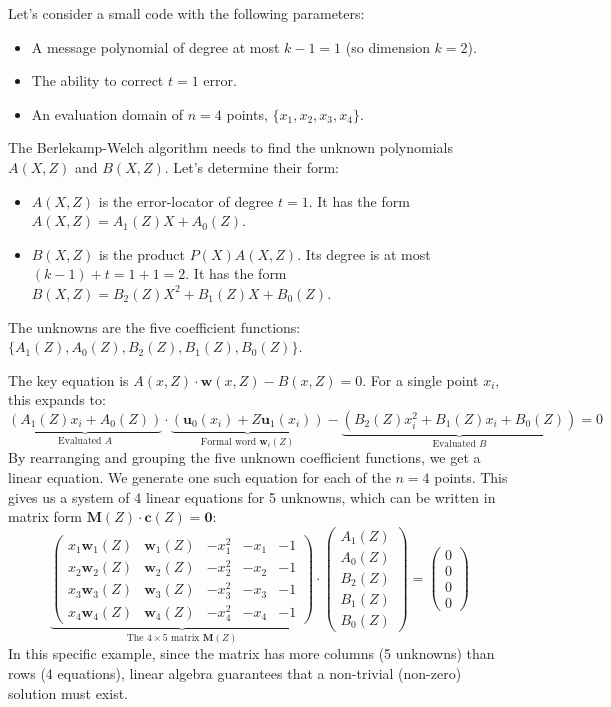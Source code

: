 \documentclass{article}
\begin{document}
\begin{tcolorbox}[breakable, title={Illustration: A Small Example of the Matrix $\mathbf{M}(Z)$}]
Let's consider a small code with the following parameters:
\begin{itemize}
    \item A message polynomial of degree at most $k-1=1$ (so dimension $k=2$).
    \item The ability to correct $t=1$ error.
    \item An evaluation domain of $n=4$ points, $\{x_1, x_2, x_3, x_4\}$.
\end{itemize}
The Berlekamp-Welch algorithm needs to find the unknown polynomials $A(X,Z)$ and $B(X,Z)$. Let's determine their form:
\begin{itemize}
    \item $A(X,Z)$ is the error-locator of degree $t=1$. It has the form $A(X,Z) = A_1(Z)X + A_0(Z)$.
    \item $B(X,Z)$ is the product $P(X)A(X,Z)$. Its degree is at most $(k-1)+t = 1+1=2$. It has the form $B(X,Z) = B_2(Z)X^2 + B_1(Z)X + B_0(Z)$.
\end{itemize}
The unknowns are the five coefficient functions: $\{A_1(Z), A_0(Z), B_2(Z), B_1(Z), B_0(Z)\}$.

The key equation is $A(x,Z) \cdot \mathbf{w}(x,Z) - B(x,Z) = 0$. For a single point $x_i$, this expands to:
\[ \underbrace{\left( A_1(Z)x_i + A_0(Z) \right)}_{\text{Evaluated } A} \cdot \underbrace{\left( \mathbf{u}_0(x_i) + Z\mathbf{u}_1(x_i) \right)}_{\text{Formal word } \mathbf{w}_i(Z)} - \underbrace{\left( B_2(Z)x_i^2 + B_1(Z)x_i + B_0(Z) \right)}_{\text{Evaluated } B} = 0 \]
By rearranging and grouping the five unknown coefficient functions, we get a linear equation. We generate one such equation for each of the $n=4$ points. This gives us a system of 4 linear equations for 5 unknowns, which can be written in matrix form $\mathbf{M}(Z) \cdot \mathbf{c}(Z) = \mathbf{0}$:
\[
\underbrace{
\begin{pmatrix}
x_1 \mathbf{w}_1(Z) & \mathbf{w}_1(Z) & -x_1^2 & -x_1 & -1 \\
x_2 \mathbf{w}_2(Z) & \mathbf{w}_2(Z) & -x_2^2 & -x_2 & -1 \\
x_3 \mathbf{w}_3(Z) & \mathbf{w}_3(Z) & -x_3^2 & -x_3 & -1 \\
x_4 \mathbf{w}_4(Z) & \mathbf{w}_4(Z) & -x_4^2 & -x_4 & -1
\end{pmatrix}
}_{\text{The } 4 \times 5 \text{ matrix } \mathbf{M}(Z)}
\cdot
\begin{pmatrix}
A_1(Z) \\ A_0(Z) \\ B_2(Z) \\ B_1(Z) \\ B_0(Z)
\end{pmatrix}
=
\begin{pmatrix}
0 \\ 0 \\ 0 \\ 0
\end{pmatrix}
\]
In this specific example, since the matrix has more columns (5 unknowns) than rows (4 equations), linear algebra guarantees that a non-trivial (non-zero) solution must exist.


\end{tcolorbox}
\end{document}
